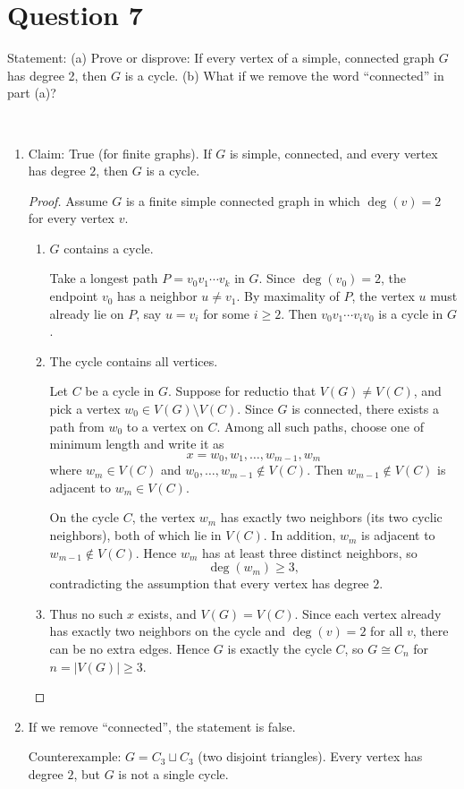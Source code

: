 \documentclass[11pt]{article}
\begin{document}
\newpage

\section*{Question 7}

Statement: (a) Prove or disprove: If every vertex of a simple, connected graph $G$ has degree 2, then $G$ is a cycle. (b) What if we remove the word “connected” in part (a)?

~

\begin{enumerate}
    \item Claim: True (for finite graphs). If $G$ is simple, connected, and every vertex has degree $2$,
then $G$ is a cycle.

\begin{proof}
Assume $G$ is a finite simple connected graph in which $\deg(v)=2$ for every vertex $v$.

\begin{enumerate}
    \item $G$ contains a cycle.

Take a longest path $P=v_0v_1\cdots v_k$ in $G$. Since $\deg(v_0)=2$, the endpoint $v_0$
has a neighbor $u\neq v_1$. By maximality of $P$, the vertex $u$ must already lie on $P$,
say $u=v_i$ for some $i\ge 2$. Then $v_0v_1\cdots v_i v_0$ is a cycle in $G$.

\item The cycle contains all vertices.

Let $C$ be a cycle in $G$. Suppose for reductio that $V(G)\neq V(C)$, and pick a vertex
$w_0\in V(G)\setminus V(C)$. Since $G$ is connected, there exists a path from $w_0$ to a vertex on $C$.
Among all such paths, choose one of minimum length and write it as
\[
x=w_0,w_1,\dots,w_{m-1},w_m
\]
where $w_m\in V(C)$ and $w_0,\dots,w_{m-1}\notin V(C)$. Then $w_{m-1}\notin V(C)$ is adjacent to
$w_m\in V(C)$.

On the cycle $C$, the vertex $w_m$ has exactly two neighbors (its two cyclic neighbors), both of which
lie in $V(C)$. In addition, $w_m$ is adjacent to $w_{m-1}\notin V(C)$. Hence $w_m$ has at least three
distinct neighbors, so
\[
\deg(w_m)\ge 3,
\]
contradicting the assumption that every vertex has degree $2$.

\item Thus no such $x$ exists, and $V(G)=V(C)$. Since each vertex already has exactly two neighbors on
the cycle and $\deg(v)=2$ for all $v$, there can be no extra edges. Hence $G$ is exactly the cycle $C$,
so $G\cong C_n$ for $n=|V(G)|\ge 3$.
\end{enumerate}
\end{proof}

\item If we remove ``connected'', the statement is false.

\smallskip
\noindent Counterexample: $G=C_3\sqcup C_3$ (two disjoint triangles). Every vertex has degree $2$,
but $G$ is not a single cycle.
\end{enumerate}
\end{document}
